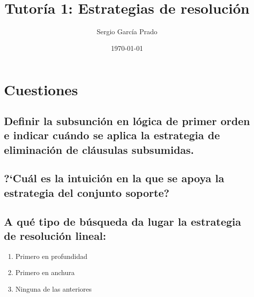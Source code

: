 \documentclass[10pt, a4paper,spanish]{article}
\title{\vspace{-15mm}\fontsize{24pt}{10pt}\selectfont\textbf{Tutoría 1: Estrategias de resolución}} %
\author{Sergio García Prado}
\date{\today}
\begin{document}
	\maketitle %

	\thispagestyle{fancy} %



	\section{Cuestiones}


		\subsection{Definir la subsunción en lógica de primer orden e indicar cuándo se aplica la estrategia de eliminación de cláusulas subsumidas.}

			\paragraph{}


		\subsection{?`Cuál es la intuición en la que se apoya la estrategia del conjunto soporte?}

			\paragraph{}


		\subsection{A qué tipo de búsqueda da lugar la estrategia de resolución lineal:}

			\begin{enumerate}[label=\Alph*)]
				\item Primero en profundidad
				\item Primero en anchura
				\item Ninguna de las anteriores
			\end{enumerate}

			\paragraph{}
\end{document}
